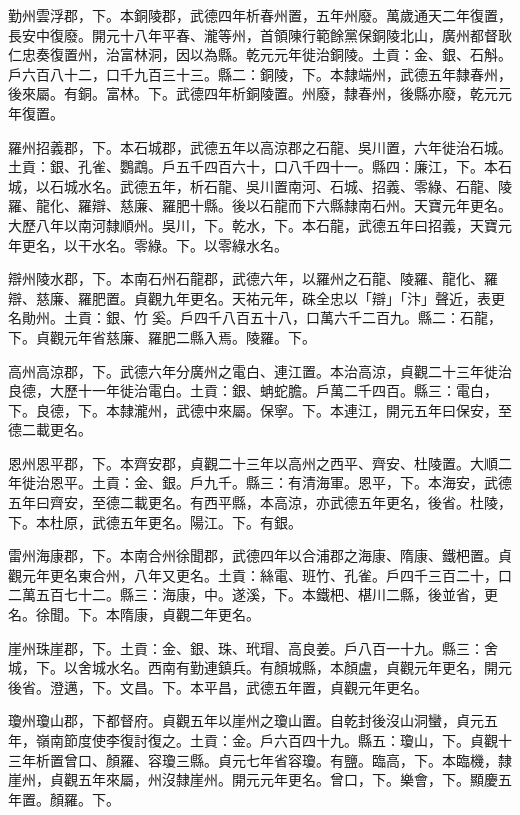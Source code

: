 \begin{pinyinscope}
 勤州雲浮郡，下。本銅陵郡，武德四年析春州置，五年州廢。萬歲通天二年復置，長安中復廢。開元十八年平春、瀧等州，首領陳行範餘黨保銅陵北山，廣州都督耿仁忠奏復置州，治富林洞，因以為縣。乾元元年徙治銅陵。土貢：金、銀、石斛。戶六百八十二，口千九百三十三。縣二：銅陵，下。本隸端州，武德五年隸春州，後來屬。有銅。富林。下。武德四年析銅陵置。州廢，隸春州，後縣亦廢，乾元元年復置。



 羅州招義郡，下。本石城郡，武德五年以高涼郡之石龍、吳川置，六年徙治石城。土貢：銀、孔雀、鸚鵡。戶五千四百六十，口八千四十一。縣四：廉江，下。本石城，以石城水名。武德五年，析石龍、吳川置南河、石城、招義、零綠、石龍、陵羅、龍化、羅辯、慈廉、羅肥十縣。後以石龍而下六縣隸南石州。天寶元年更名。大歷八年以南河隸順州。吳川，下。乾水，下。本石龍，武德五年曰招義，天寶元年更名，以干水名。零綠。下。以零綠水名。



 辯州陵水郡，下。本南石州石龍郡，武德六年，以羅州之石龍、陵羅、龍化、羅辯、慈廉、羅肥置。貞觀九年更名。天祐元年，硃全忠以「辯」「汴」聲近，表更名勛州。土貢：銀、竹奚。戶四千八百五十八，口萬六千二百九。縣二：石龍，下。貞觀元年省慈廉、羅肥二縣入焉。陵羅。下。



 高州高涼郡，下。武德六年分廣州之電白、連江置。本治高涼，貞觀二十三年徙治良德，大歷十一年徙治電白。土貢：銀、蚺蛇膽。戶萬二千四百。縣三：電白，下。良德，下。本隸瀧州，武德中來屬。保寧。下。本連江，開元五年曰保安，至德二載更名。



 恩州恩平郡，下。本齊安郡，貞觀二十三年以高州之西平、齊安、杜陵置。大順二年徙治恩平。土貢：金、銀。戶九千。縣三：有清海軍。恩平，下。本海安，武德五年曰齊安，至德二載更名。有西平縣，本高涼，亦武德五年更名，後省。杜陵，下。本杜原，武德五年更名。陽江。下。有銀。



 雷州海康郡，下。本南合州徐聞郡，武德四年以合浦郡之海康、隋康、鐵杷置。貞觀元年更名東合州，八年又更名。土貢：絲電、班竹、孔雀。戶四千三百二十，口二萬五百七十二。縣三：海康，中。遂溪，下。本鐵杷、椹川二縣，後並省，更名。徐聞。下。本隋康，貞觀二年更名。



 崖州珠崖郡，下。土貢：金、銀、珠、玳瑁、高良姜。戶八百一十九。縣三：舍城，下。以舍城水名。西南有勤連鎮兵。有顏城縣，本顏盧，貞觀元年更名，開元後省。澄邁，下。文昌。下。本平昌，武德五年置，貞觀元年更名。



 瓊州瓊山郡，下都督府。貞觀五年以崖州之瓊山置。自乾封後沒山洞蠻，貞元五年，嶺南節度使李復討復之。土貢：金。戶六百四十九。縣五：瓊山，下。貞觀十三年析置曾口、顏羅、容瓊三縣。貞元七年省容瓊。有鹽。臨高，下。本臨機，隸崖州，貞觀五年來屬，州沒隸崖州。開元元年更名。曾口，下。樂會，下。顯慶五年置。顏羅。下。




\end{pinyinscope}
